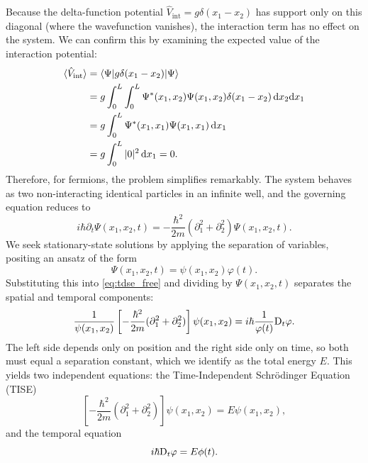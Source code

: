 Because the delta-function potential $\hat{V}_{\text{int}} = g\delta(x_1 - x_2)$
has support only on this diagonal (where the wavefunction vanishes),
the interaction term has no effect on the system.
We can confirm this by examining the expected value of the
interaction potential:
\begin{align} \label{eq:V_int_expectation}
	\braket{\hat{V}_{\text{int}}}
		&= \braket{\Psi | g\delta(x_1 - x_2) | \Psi} \nonumber \\
		&= g \int_{0}^L \int_{0}^L \Psi^*(x_1, x_2)\Psi(x_1, x_2)
		\delta(x_1 - x_2) \, \mathrm{d}x_2 \mathrm{d}x_1 \nonumber \\
		&= g \int_{0}^L \Psi^*(x_1, x_1) \Psi(x_1, x_1) \, \mathrm{d}x_1 \nonumber \\
		&= g \int_{0}^L |0|^2 \, \mathrm{d}x_1 = 0.
\end{align}
Therefore, for fermions, the problem simplifies remarkably. The system
behaves as two non-interacting identical particles in an infinite well,
and the governing equation reduces to
\begin{equation} \label{eq:tdse_free}
	i\hbar\partial_t\Psi(x_1, x_2, t) =
	-\frac{\hbar^2}{2m}\left(\partial_{1}^2 + \partial_{2}^2\right)
	\Psi(x_1, x_2, t).
\end{equation}
We seek stationary-state solutions by applying the separation of variables,
positing an ansatz of the form
\begin{equation}
	\Psi(x_1, x_2, t) = \psi(x_1, x_2) \varphi(t).
\end{equation}
Substituting this into \cref{eq:tdse_free} and dividing by
$\Psi(x_1, x_2, t)$ separates the spatial and temporal components:
\begin{equation}
	\frac{1}{\psi(x_1, x_2)} \left[
		-\frac{\hbar^2}{2m}(\partial_{1}^2 + \partial_{2}^2)
	\right] \psi(x_1, x_2)
	= i\hbar \frac{1}{\varphi(t)} \mdv{t}!_{\varphi}.
\end{equation}
The left side depends only on position and the right side only on time,
so both must equal a separation constant, which we identify as the
total energy $E$. This yields two independent equations: the
Time-Independent Schrödinger Equation (TISE)
\begin{equation} \label{eq:tise}
	\left[ -\frac{\hbar^2}{2m} (\partial_{1}^2 + \partial_{2}^2) \right]
	\psi(x_1, x_2) = E \psi(x_1, x_2),
\end{equation}
and the temporal equation
\begin{equation} \label{eq:time_eq}
	i\hbar \mdv{t}!_{\varphi} = E \phi(t).
\end{equation}

